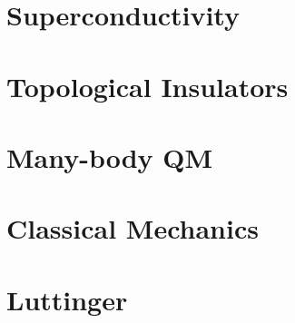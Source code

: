 \documentclass[mathserif]{beamer}
\begin{document}
	\color{white}
	
	
	
	
	
	\section{Superconductivity}
	
	
	
	\section{Topological Insulators}
	
	
	
	\section{Many-body QM}
	
	
	\section{Classical Mechanics}
	
	

	\section{Luttinger}
	

	
\end{document}
